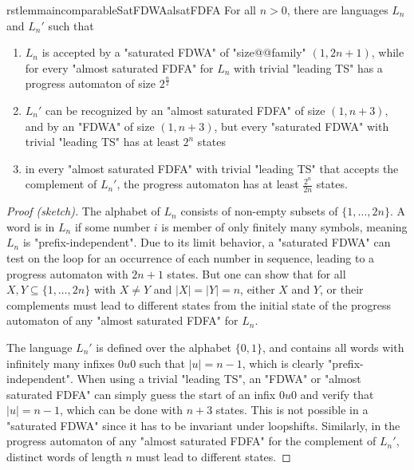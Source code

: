 \documentclass[a4paper,USenglish,cleveref,autoref,thm-restate]{lipics-v2021}
\begin{document}
\begin{restatable}{rstlemma}{incomparableSatFDWAalsatFDFA}
  \label{lemma:incomparableSatFDWAalsatFDFA} 
  For all $n > 0$, there are languages $L_n$ and $L_n'$
such that
  \begin{enumerate}
      \item\label{satFDWAsmall:alsatFDFAbig}
      $L_n$ is accepted by a "saturated FDWA" of "size@@family" $(1,2n+1)$, while for every "almost saturated FDFA" for $L_n$ with trivial "leading TS" has a progress automaton of size $2^{\frac{n}{2}}$
      \item\label{alsatFDFAsmall:FDWAsmall:satFDWAbig}
      $L_n'$ can be recognized by an "almost saturated FDFA" of size $(1,n+3)$, and by an "FDWA" of size $(1,n+3)$, but every "saturated FDWA" with trivial "leading TS" has at least $2^n$ states
      \item\label{alsatFDFAcomplementbig}
      in every "almost saturated FDFA" with trivial "leading TS" that accepts the complement of $L_n'$, the progress automaton has at least $\frac{2^n}{2n}$ states.
  \end{enumerate}
\end{restatable}
\begin{proof}[Proof (sketch)]
    The alphabet of $L_n$ consists of non-empty subsets of $\{1,\dots,2n\}$.
    A word is in $L_n$ if some number $i$ is member of only finitely many symbols, meaning $L_n$ is "prefix-independent".
    Due to its limit behavior, a "saturated FDWA" can test on the loop for an occurrence of each number in sequence, leading to a progress automaton with $2n+1$ states.
    But one can show that for all $X,Y \subseteq \{1,\dots,2n\}$ with $X \not= Y$ and $|X| = |Y| = n$, either $X$ and $Y$, or their complements must lead to different states from the initial state of the progress automaton of any "almost saturated FDFA" for $L_n$.

    The language $L_n'$ is defined over the alphabet $\{0,1\}$, and contains all words with infinitely many infixes $0u0$ such that $|u| = n-1$, which is clearly "prefix-independent".
    When using a trivial "leading TS", an "FDWA" or "almost saturated FDFA" can simply guess the start of an infix $0u0$ and verify that $|u| = n-1$, which can be done with $n+3$ states.
    This is not possible in a "saturated FDWA" since it has to be invariant under loopshifts.
    Similarly, in the progress automaton of any "almost saturated FDFA" for the complement of $L_n'$, distinct words of length $n$ must lead to different states.
\end{proof}
\end{document}
